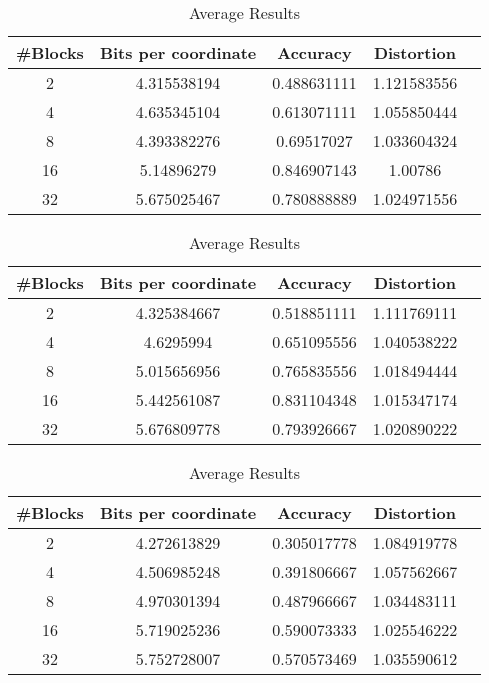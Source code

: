 \begin{table}[h!]
	\centering
	\caption{Average Results \sift{} \qs{}}
	\label{table:avg_sift_qs}
	\begin{tabular}{ccccc}
		\hline
		\#Blocks & Bits per coordinate & Accuracy  & Distortion \\ \hline
		2 & 4.315538194	& 0.488631111 & 1.121583556  \\
		4 & 4.635345104 & 0.613071111 & 1.055850444  \\
		8 & 4.393382276 & 0.69517027 & 1.033604324 \\
		16 & 5.14896279 & 0.846907143 & 1.00786 \\
		32 & 5.675025467 & 0.780888889 & 1.024971556 \\
		\hline
	\end{tabular}
\end{table}

\begin{table}[h!]
	\centering
	\caption{Average Results \sift{} \qsr{}}
	\label{table:avg_sift_qsr}
	\begin{tabular}{ccccc}
		\hline
		\#Blocks & Bits per coordinate & Accuracy  & Distortion \\ \hline
		2 & 4.325384667	& 0.518851111 & 1.111769111  \\
		4 & 4.6295994 & 0.651095556 & 1.040538222  \\
		8 & 5.015656956 & 0.765835556 & 1.018494444 \\
		16 & 5.442561087 & 0.831104348 & 1.015347174 \\
		32 & 5.676809778 & 0.793926667 & 1.020890222 \\
		\hline
	\end{tabular}
\end{table}

\begin{table}[h!]
	\centering
	\caption{Average Results \clust{} \qs{}}
	\label{table:avg_clust_qs}
	\begin{tabular}{ccccc}
		\hline
		\#Blocks & Bits per coordinate & Accuracy  & Distortion \\ \hline
		2 & 4.272613829	& 0.305017778 & 1.084919778  \\
		4 & 4.506985248 & 0.391806667 & 1.057562667  \\
		8 & 4.970301394 & 0.487966667 & 1.034483111 \\
		16 & 5.719025236 & 0.590073333 & 1.025546222 \\
		32 & 5.752728007 & 0.570573469 & 1.035590612 \\
		\hline
	\end{tabular}
\end{table}

